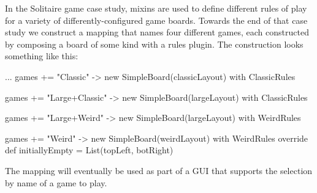 \documentclass{ip3}
\begin{document}
\begin{foil}
\begin{exercise}
\begin{answer}
\end{answer}
\end{exercise}
\begin{note}
In the Solitaire game case study, mixins are used to define different rules
of play for a variety of differently-configured game boards. Towards the
end of that case study we construct a mapping that names four
different games, each constructed by composing a board of some kind with
a rules plugin. The construction looks something like this:
\begin{--scala}
      ...
      games += "Classic"          -> new SimpleBoard(classicLayout) with ClassicRules
                                                                    
      games += "Large+Classic"    -> new SimpleBoard(largeLayout)   with ClassicRules
      
      games += "Large+Weird"      -> new SimpleBoard(largeLayout)   with WeirdRules
      
      games += "Weird"            -> new SimpleBoard(weirdLayout)   with WeirdRules
                                         { override 
                                             def initiallyEmpty = List(topLeft, botRight) }
\end{--scala}
The mapping will eventually be used as part of a GUI that supports the
selection by name of a game to play.
\end{note}
\end{foil}




\end{document}
